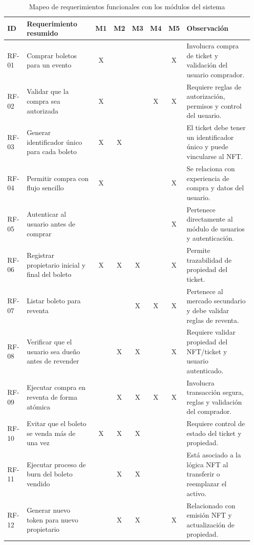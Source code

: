 \documentclass[12pt,letterpaper]{article}
\begin{document}
\begin{table}[htbp]
\centering
\scriptsize
\caption{Mapeo de requerimientos funcionales con los módulos del sistema}
\label{tab:mapeo_requerimientos_modulos}

\begin{tabularx}{\textwidth}{|p{1.2cm}|X|c|c|c|c|c|X|}
\hline
\textbf{ID} & \textbf{Requerimiento resumido} & \textbf{M1} & \textbf{M2} & \textbf{M3} & \textbf{M4} & \textbf{M5} & \textbf{Observación} \\ \hline

RF-01 & Comprar boletos para un evento & X &  &  &  & X & Involucra compra de ticket y validación del usuario comprador. \\ \hline
RF-02 & Validar que la compra sea autorizada & X &  &  & X & X & Requiere reglas de autorización, permisos y control del usuario. \\ \hline
RF-03 & Generar identificador único para cada boleto & X & X &  &  &  & El ticket debe tener un identificador único y puede vincularse al NFT. \\ \hline
RF-04 & Permitir compra con flujo sencillo & X &  &  &  & X & Se relaciona con experiencia de compra y datos del usuario. \\ \hline
RF-05 & Autenticar al usuario antes de comprar &  &  &  &  & X & Pertenece directamente al módulo de usuarios y autenticación. \\ \hline
RF-06 & Registrar propietario inicial y final del boleto & X & X & X &  & X & Permite trazabilidad de propiedad del ticket. \\ \hline
RF-07 & Listar boleto para reventa &  &  & X & X & X & Pertenece al mercado secundario y debe validar reglas de reventa. \\ \hline
RF-08 & Verificar que el usuario sea dueño antes de revender &  & X & X &  & X & Requiere validar propiedad del NFT/ticket y usuario autenticado. \\ \hline
RF-09 & Ejecutar compra en reventa de forma atómica &  & X & X & X & X & Involucra transacción segura, reglas y validación del comprador. \\ \hline
RF-10 & Evitar que el boleto se venda más de una vez & X & X & X &  &  & Requiere control de estado del ticket y propiedad. \\ \hline
RF-11 & Ejecutar proceso de burn del boleto vendido &  & X & X &  &  & Está asociado a la lógica NFT al transferir o reemplazar el activo. \\ \hline
RF-12 & Generar nuevo token para nuevo propietario &  & X & X &  & X & Relacionado con emisión NFT y actualización de propiedad. \\ \hline

\end{tabularx}
\end{table}
\end{document}
